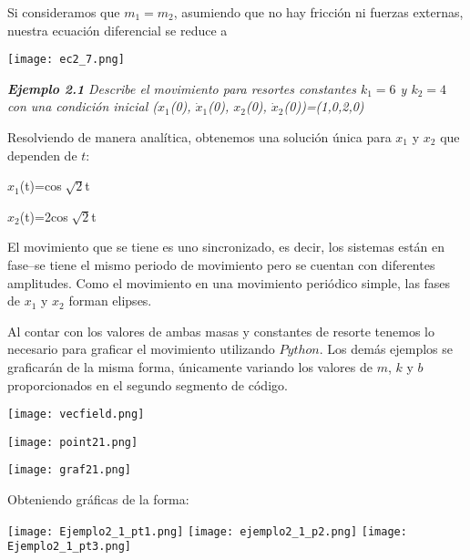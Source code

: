 \documentclass{article}
\begin{document}
Si consideramos que $m_1=m_2$, asumiendo que no hay fricción ni fuerzas externas, nuestra ecuación diferencial se reduce a

	\begin{center}
    \texttt{[image: ec2\_7.png]}
    \end{center}

\textbf{\textit{Ejemplo 2.1}} 
\textit{Describe el movimiento para resortes constantes $k_1=6$ y $k_2=4$ con una condición inicial ($x_1$(0), $\dot{x}_1$(0), $x_2$(0), $\dot{x}_2$(0))=(1,0,2,0)}

Resolviendo de manera analítica, obtenemos una solución única para $x_1$ y $x_2$ que dependen de $t$:

\begin{center}
$x_1$(t)=cos$\sqrt[]{2}$t
\end{center}

\begin{center}
$x_2$(t)=2cos$\sqrt[]{2}$t
\end{center}

El movimiento que se tiene es uno sincronizado, es decir, los sistemas están en fase--se tiene el mismo periodo de movimiento pero se cuentan con diferentes amplitudes. Como el movimiento en una movimiento periódico simple, las fases de $x_1$ y $x_2$ forman elipses.

Al contar con los valores de ambas masas y constantes de resorte tenemos lo necesario para graficar el movimiento utilizando $Python$. Los demás ejemplos se graficarán de la misma forma, únicamente variando los valores de $m$, $k$ y $b$ proporcionados en el segundo segmento de código.

	\begin{center}
    \texttt{[image: vecfield.png]}
    \end{center}
    
    \begin{center}
    \texttt{[image: point21.png]}
    \end{center}   
    
    \begin{center}
    \texttt{[image: graf21.png]}
    \end{center}
    
Obteniendo gráficas de la forma:

\begin{center}
\texttt{[image: Ejemplo2\_1\_pt1.png]}
\texttt{[image: ejemplo2\_1\_p2.png]}
\texttt{[image: Ejemplo2\_1\_pt3.png]}
\end{center}
\end{document}
